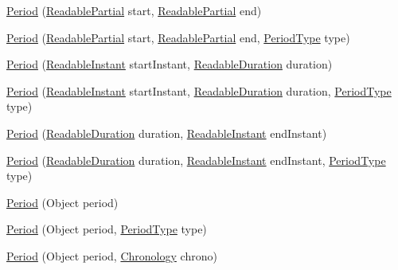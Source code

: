 \begin{DoxyCompactItemize}
\item 
\hyperlink{classorg_1_1joda_1_1time_1_1_period_a82934b24caa3c9356d7ee31a67745fc4}{Period} (\hyperlink{interfaceorg_1_1joda_1_1time_1_1_readable_partial}{Readable\-Partial} start, \hyperlink{interfaceorg_1_1joda_1_1time_1_1_readable_partial}{Readable\-Partial} end)
\item 
\hyperlink{classorg_1_1joda_1_1time_1_1_period_a647e95a40ea14a42295ecad108171845}{Period} (\hyperlink{interfaceorg_1_1joda_1_1time_1_1_readable_partial}{Readable\-Partial} start, \hyperlink{interfaceorg_1_1joda_1_1time_1_1_readable_partial}{Readable\-Partial} end, \hyperlink{classorg_1_1joda_1_1time_1_1_period_type}{Period\-Type} type)
\item 
\hyperlink{classorg_1_1joda_1_1time_1_1_period_ad5453618f3627435523b38382dad0ac1}{Period} (\hyperlink{interfaceorg_1_1joda_1_1time_1_1_readable_instant}{Readable\-Instant} start\-Instant, \hyperlink{interfaceorg_1_1joda_1_1time_1_1_readable_duration}{Readable\-Duration} duration)
\item 
\hyperlink{classorg_1_1joda_1_1time_1_1_period_a6fcd0f6d7094c016b528188079aacde0}{Period} (\hyperlink{interfaceorg_1_1joda_1_1time_1_1_readable_instant}{Readable\-Instant} start\-Instant, \hyperlink{interfaceorg_1_1joda_1_1time_1_1_readable_duration}{Readable\-Duration} duration, \hyperlink{classorg_1_1joda_1_1time_1_1_period_type}{Period\-Type} type)
\item 
\hyperlink{classorg_1_1joda_1_1time_1_1_period_a126c509990fbc6f07663d69707574687}{Period} (\hyperlink{interfaceorg_1_1joda_1_1time_1_1_readable_duration}{Readable\-Duration} duration, \hyperlink{interfaceorg_1_1joda_1_1time_1_1_readable_instant}{Readable\-Instant} end\-Instant)
\item 
\hyperlink{classorg_1_1joda_1_1time_1_1_period_a24b98b99a30be329b06150ed2968ca7a}{Period} (\hyperlink{interfaceorg_1_1joda_1_1time_1_1_readable_duration}{Readable\-Duration} duration, \hyperlink{interfaceorg_1_1joda_1_1time_1_1_readable_instant}{Readable\-Instant} end\-Instant, \hyperlink{classorg_1_1joda_1_1time_1_1_period_type}{Period\-Type} type)
\item 
\hyperlink{classorg_1_1joda_1_1time_1_1_period_a3c2a825343dfcc9501f1e4d8b01ce4bf}{Period} (Object period)
\item 
\hyperlink{classorg_1_1joda_1_1time_1_1_period_a3bbcd109315bef25ad63450b0a1d1e7a}{Period} (Object period, \hyperlink{classorg_1_1joda_1_1time_1_1_period_type}{Period\-Type} type)
\item 
\hyperlink{classorg_1_1joda_1_1time_1_1_period_a601e04ecee00f62e5dd0dce1f9559673}{Period} (Object period, \hyperlink{classorg_1_1joda_1_1time_1_1_chronology}{Chronology} chrono)

\end{DoxyCompactItemize}

